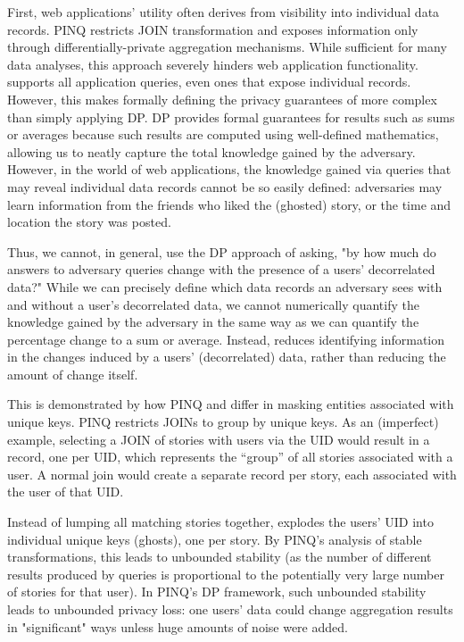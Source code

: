 First, web applications' utility often derives from visibility into individual data records. PINQ
restricts JOIN transformation and exposes information only through differentially-private
aggregation mechanisms. While sufficient for many data analyses, this approach severely hinders web
application functionality. \sys{} supports all application queries, even ones that expose individual
records.  However, this makes formally defining the privacy guarantees of \sys{} more complex than
simply applying DP.  DP provides formal guarantees for results such as sums or averages because such
results are computed using well-defined mathematics, allowing us to neatly capture the total
knowledge gained by the adversary. However, in the world of web applications, the knowledge gained
via queries that may reveal individual data records cannot be so easily defined: adversaries may
learn information from the friends who liked the (ghosted) story, or the time and location the story
was posted.

Thus, we cannot, in general, use the DP approach of asking, "by how much do answers to adversary
queries change with the presence of a users' decorrelated data?" While we can precisely define which
data records an adversary sees with and without a user's decorrelated data, we cannot numerically
quantify the knowledge gained by the adversary in the same way as we can quantify the percentage
change to a sum or average.
Instead, \sys{} reduces identifying information in the changes induced by a users' (decorrelated)
data, rather than reducing the amount of change itself.

This is demonstrated by how PINQ and \sys{} differ in masking entities associated with unique keys.
PINQ restricts JOINs to group by unique keys. As an (imperfect) example, selecting a JOIN of stories
with users via the UID would result in a record, one per UID, which represents the ``group'' of all
stories associated with a user. A normal join would create a separate record per story, each
associated with the user of that UID.

Instead of lumping all matching stories together, \sys{} explodes the users' UID into individual
unique keys (ghosts), one per story. By PINQ's analysis of stable transformations, this leads to
unbounded stability (as the number of different results produced by queries is proportional to the
potentially very large number of stories for that user). In PINQ's DP framework, such unbounded
stability leads to unbounded privacy loss: one users' data could change aggregation results in
"significant" ways unless huge amounts of noise were added. 

